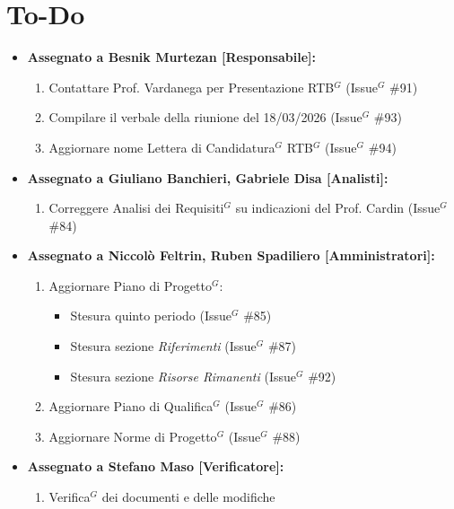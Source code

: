 \documentclass[a4paper,10pt]{article}
\begin{document}
\section*{To-Do}
\begin{itemize}
\item \textbf{Assegnato a Besnik Murtezan [Responsabile]:}
    \begin{enumerate}
    \item Contattare Prof. Vardanega per Presentazione RTB$^G$ (Issue$^G$ \#91)
    \item Compilare il verbale della riunione del 18/03/2026 (Issue$^G$ \#93)
    \item Aggiornare nome Lettera di Candidatura$^G$ RTB$^G$ (Issue$^G$ \#94)
    \end{enumerate}
\item \textbf{Assegnato a Giuliano Banchieri, Gabriele Disa [Analisti]:}
    \begin{enumerate}
    \item Correggere Analisi dei Requisiti$^G$ su indicazioni del Prof. Cardin (Issue$^G$ \#84)
    \end{enumerate}
\item \textbf{Assegnato a Niccolò Feltrin, Ruben Spadiliero [Amministratori]:}
    \begin{enumerate}
    \item Aggiornare Piano di Progetto$^G$:
      \begin{itemize}
        \item Stesura quinto periodo (Issue$^G$ \#85)
        \item Stesura sezione \textit{Riferimenti} (Issue$^G$ \#87)
        \item Stesura sezione \textit{Risorse Rimanenti} (Issue$^G$ \#92)
      \end{itemize}
    \item Aggiornare Piano di Qualifica$^G$ (Issue$^G$ \#86)
    \item Aggiornare Norme di Progetto$^G$ (Issue$^G$ \#88)
    \end{enumerate}
\item \textbf{Assegnato a Stefano Maso [Verificatore]:}
    \begin{enumerate}
    \item Verifica$^G$ dei documenti e delle modifiche
    \end{enumerate}
\end{itemize}
\end{document}
